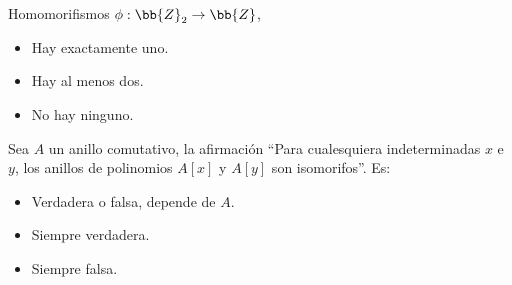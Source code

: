 \begin{ejercicio}
    Homomorifismos $\phi : \bb{Z}_2 \rightarrow \bb{Z}$,
    \begin{itemize}
        \item Hay exactamente uno.
        \item Hay al menos dos.
        \item No hay ninguno.
    \end{itemize}
\end{ejercicio}

\begin{ejercicio}
    Sea $A$ un anillo comutativo, la afirmación ``Para cualesquiera indeterminadas $x$ e $y$, los anillos de polinomios $A[x]$ y $A[y]$ son isomorifos''. Es:
    \begin{itemize}
        \item Verdadera o falsa, depende de $A$.
        \item Siempre verdadera.
        \item Siempre falsa.
    \end{itemize}
\end{ejercicio}

\newpage
\resetearcontador

